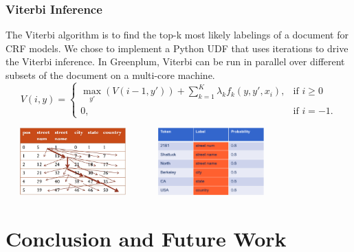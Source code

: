 \documentclass{beamer}
\begin{document}
\begin{frame}
  \frametitle{Viterbi Inference}
  The Viterbi algorithm is to find the top-k most likely labelings of a document 
for CRF models. 
We chose to implement a Python UDF that uses iterations to drive the Viterbi inference. 
In Greenplum, Viterbi can be run in parallel over different subsets 
of the document on a multi-core machine.
\[
V(i,y) =
\begin{cases}
 \max_{y'}(V(i-1,y')) + \textstyle \sum_{k=1}^K \lambda_kf_k(y,y',x_i), & \text{if } i\ge0 \\
 0, & \text{if } i=-1.
\end{cases}
\]
\begin{center}		             
      \includegraphics[height=7em,width=14em]{viterbip.jpg}
      \includegraphics[height=7em,width=14em]{result.png}\\
\end{center}
\end{frame}

\section{Conclusion and Future Work}
\end{document}
